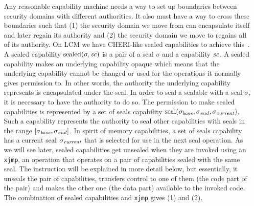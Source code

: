 \documentclass{jfp}
\newcommand{\trgcm}{\textsc{LCM}}
\begin{document}
Any reasonable capability machine needs a way to set up boundaries between security domains with different authorities.
It also must have a way to cross these boundaries such that (1) the security domain we move from can encapsulate itself and later regain its authority and (2) the security domain we move to regains all of its authority. 
On \trgcm{} we have CHERI-like sealed capabilities to achieve this~\cite{watson_cheri_2015,watson_fast_2016}.
A sealed capability $\mathrm{sealed}(\sigma,\mathit{sc})$ is a pair of a seal $\sigma$ and a capability $\mathit{sc}$.
A sealed capability makes an underlying capability opaque which means that the underlying capability cannot be changed or used for the operations it normally gives permission to.
In other words, the authority the underlying capability represents is encapsulated under the seal.
In order to seal a sealable with a seal $\sigma$, it is necessary to have the authority to do so.
The permission to make sealed capabilities is represented by a set of seals capability $\mathrm{seal}(\sigma_{\mathit{base}},\sigma_{\mathit{end}},\sigma_{\mathit{current}})$.
Such a capability represents the authority to seal other capabilities with seals in the range $[\sigma_{\mathit{base}},\sigma_{\mathit{end}}]$.
In spirit of memory capabilities, a set of seals capability has a current seal $\sigma_{\mathit{current}}$ that is selected for use in the next seal operation.
As we will see later, sealed capabilities get unsealed when they are invoked using an \texttt{xjmp}, an operation that operates on a pair of capabilities sealed with the same seal.
The instruction will be explained in more detail below, but essentially, it unseals the pair of capabilities, transfers control to one of them (the code part of the pair) and makes the other one (the data part) available to the invoked code.
The combination of sealed capabilities and \texttt{xjmp} gives (1) and (2).
\end{document}
